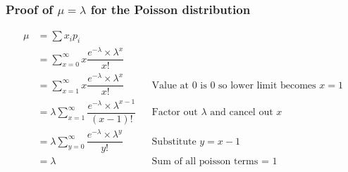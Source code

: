             \subsubsection{Proof of $\mu=\lambda$ for the Poisson distribution}
                \begin{align*}
                    \mu &= \sum x_i p_i \\
                        &= \sum_{x=0}^\infty x \dfrac{e^{-\lambda}\times\lambda^{x}}{x!} \\
                        &= \sum_{x=1}^\infty x \dfrac{e^{-\lambda}\times\lambda^{x}}{x!} && \text{Value at 0 is 0 so lower limit becomes $x=1$} \\
                        &= \lambda \sum_{x=1}^\infty \dfrac{e^{-\lambda}\times\lambda^{x-1}}{(x-1)!} && \text{Factor out $\lambda$ and cancel out $x$} \\
                        &= \lambda \sum_{y=0}^\infty \dfrac{e^{-\lambda}\times\lambda^{y}}{y!} && \text{Substitute $y = x - 1$} \\
                        &= \lambda && \text{Sum of all poisson terms = 1}
                \end{align*}

